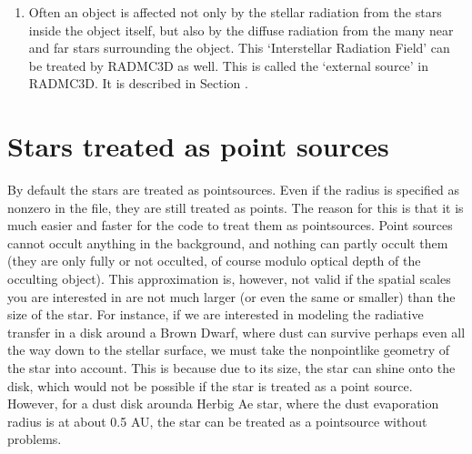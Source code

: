 \documentclass[letterpaper,10pt,english]{sphinxmanual}
\begin{document}
\begin{enumerate}
For modeling galaxies or objects of that size scale, it is of course
impossible and unnecessary to treat each star individually. So  you can specify spatial distributions of stars,
assuming that the number of stars is so large that there will always be a
very large number of them in each cell. Please note that using this
possibility does  exclude the use of individual stars as well. For
instance, for a galaxy you may want to have distributions of unresolved
stars, but one single ‘star’ for the active nucleus and perhaps a few
individual ‘stars’ for bright star formation regions or O\sphinxhyphen{}star clusters or
so. The distribution of stars is described in Section
{\hyperref[\detokenize{stars:sec-distrib-of-stars}]{}}.

\item {} 

Often an object is affected not only by the stellar radiation from the stars
inside the object itself, but also by the diffuse radiation from the many
near and far stars surrounding the object. This ‘Interstellar Radiation
Field’ can be treated by RADMC\sphinxhyphen{}3D as well. This is called the ‘external
source’ in RADMC\sphinxhyphen{}3D. It is described in Section {\hyperref[\detokenize{stars:sec-external-source}]{}}.

\end{enumerate}


\section{Stars treated as point sources}
\label{\detokenize{stars:stars-treated-as-point-sources}}\label{\detokenize{stars:sec-stars-as-points}}
By default the stars are treated as point\sphinxhyphen{}sources. Even if the radius is
specified as non\sphinxhyphen{}zero in the  file, they are still
treated as points. The reason for this is that it is much easier and faster
for the code to treat them as point\sphinxhyphen{}sources. Point sources cannot occult
anything in the background, and nothing can partly occult them (they are
only fully or not occulted, of course modulo optical depth of the occulting
object). This approximation is, however, not valid if the spatial scales you
are interested in are not much larger (or even the same or smaller) than the
size of the star. For instance, if we are interested in modeling the
radiative transfer in a disk around a Brown Dwarf, where dust can survive
perhaps even all the way down to the stellar surface, we must take the
non\sphinxhyphen{}point\sphinxhyphen{}like geometry of the star into account. This is because due to its
size, the star can shine  onto the disk, which would not be
possible if the star is treated as a point source. However, for a dust disk
arounda Herbig Ae star, where the dust evaporation radius is at about 0.5
AU, the star can be treated as a point\sphinxhyphen{}source without problems.
\end{document}
